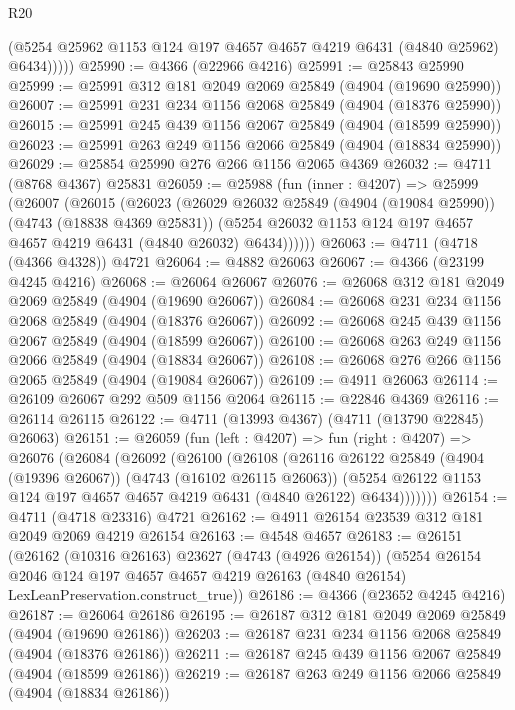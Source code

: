 \begin{lexlean}{R20}
\begin{coremodule}
            (@5254 @25962 @1153 @124 @197 @4657 @4657 @4219 @6431 (@4840 @25962) @6434)))))
@25990 := @4366 (@22966 @4216)
@25991 := @25843 @25990
@25999 := @25991 @312 @181 @2049 @2069 @25849 (@4904 (@19690 @25990))
@26007 := @25991 @231 @234 @1156 @2068 @25849 (@4904 (@18376 @25990))
@26015 := @25991 @245 @439 @1156 @2067 @25849 (@4904 (@18599 @25990))
@26023 := @25991 @263 @249 @1156 @2066 @25849 (@4904 (@18834 @25990))
@26029 := @25854 @25990 @276 @266 @1156 @2065 @4369
@26032 := @4711 (@8768 @4367) @25831
@26059 := @25988
    (fun (inner : @4207) =>
    @25999
      (@26007
        (@26015
          (@26023
            (@26029
              @26032
              @25849
              (@4904 (@19084 @25990))
              (@4743 (@18838 @4369 @25831))
              (@5254 @26032 @1153 @124 @197 @4657 @4657 @4219 @6431 (@4840 @26032) @6434))))))
@26063 := @4711 (@4718 (@4366 @4328)) @4721
@26064 := @4882 @26063
@26067 := @4366 (@23199 @4245 @4216)
@26068 := @26064 @26067
@26076 := @26068 @312 @181 @2049 @2069 @25849 (@4904 (@19690 @26067))
@26084 := @26068 @231 @234 @1156 @2068 @25849 (@4904 (@18376 @26067))
@26092 := @26068 @245 @439 @1156 @2067 @25849 (@4904 (@18599 @26067))
@26100 := @26068 @263 @249 @1156 @2066 @25849 (@4904 (@18834 @26067))
@26108 := @26068 @276 @266 @1156 @2065 @25849 (@4904 (@19084 @26067))
@26109 := @4911 @26063
@26114 := @26109 @26067 @292 @509 @1156 @2064
@26115 := @22846 @4369
@26116 := @26114 @26115
@26122 := @4711 (@13993 @4367) (@4711 (@13790 @22845) @26063)
@26151 := @26059
    (fun (left : @4207) =>
    fun (right : @4207) =>
    @26076
      (@26084
        (@26092
          (@26100
            (@26108
              (@26116
                @26122
                @25849
                (@4904 (@19396 @26067))
                (@4743 (@16102 @26115 @26063))
                (@5254 @26122 @1153 @124 @197 @4657 @4657 @4219 @6431 (@4840 @26122) @6434)))))))
@26154 := @4711 (@4718 @23316) @4721
@26162 := @4911 @26154 @23539 @312 @181 @2049 @2069 @4219 @26154
@26163 := @4548 @4657
@26183 := @26151
    (@26162
      (@10316 @26163)
      @23627
      (@4743 (@4926 @26154))
      (@5254
        @26154
        @2046
        @124
        @197
        @4657
        @4657
        @4219
        @26163
        (@4840 @26154)
        LexLeanPreservation.construct_true))
@26186 := @4366 (@23652 @4245 @4216)
@26187 := @26064 @26186
@26195 := @26187 @312 @181 @2049 @2069 @25849 (@4904 (@19690 @26186))
@26203 := @26187 @231 @234 @1156 @2068 @25849 (@4904 (@18376 @26186))
@26211 := @26187 @245 @439 @1156 @2067 @25849 (@4904 (@18599 @26186))
@26219 := @26187 @263 @249 @1156 @2066 @25849 (@4904 (@18834 @26186))

\end{coremodule}
\end{lexlean}
